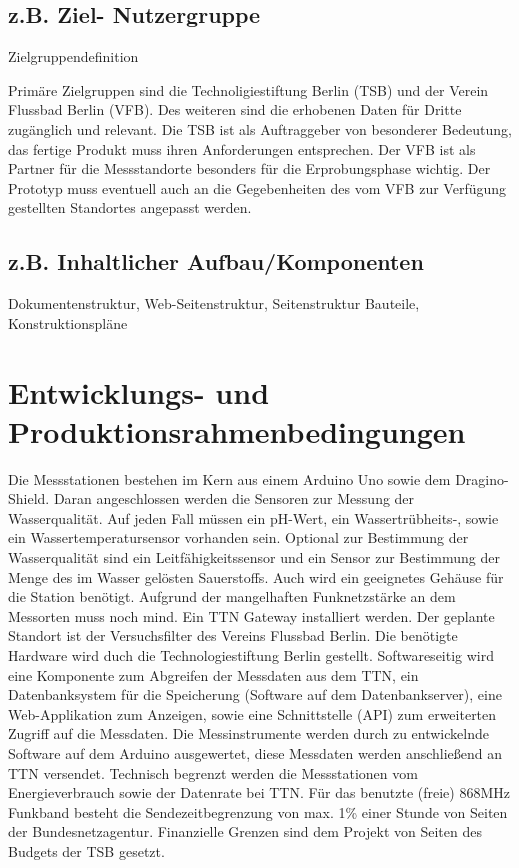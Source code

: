 \documentclass[
11pt,
a4paper,
ngerman,
]{article}
\newcommand{\descriptionWhat}[1]{%
	\begin{itshape}%
	#1 \\%
	\end{itshape}%
}
\begin{document}
\subsection{z.B. Ziel- Nutzergruppe}

\descriptionWhat{Zielgruppendefinition}

Primäre Zielgruppen sind die Technoligiestiftung Berlin (TSB) und der Verein Flussbad Berlin (VFB). Des weiteren  sind die erhobenen Daten für Dritte zugänglich und relevant. Die TSB ist als Auftraggeber von besonderer Bedeutung, das fertige Produkt muss ihren Anforderungen entsprechen. Der VFB ist als Partner für die Messstandorte besonders für die Erprobungsphase wichtig. Der Prototyp muss eventuell auch an die Gegebenheiten des vom VFB zur Verfügung gestellten Standortes angepasst werden.

\subsection{z.B. Inhaltlicher Aufbau/Komponenten}

\descriptionWhat{Dokumentenstruktur, Web-Seitenstruktur, Seitenstruktur Bauteile, Konstruktionspläne}

\newpage

\section{Entwicklungs- und Produktionsrahmenbedingungen}

Die Messstationen bestehen im Kern aus einem Arduino Uno sowie dem Dragino-Shield. Daran angeschlossen werden die Sensoren zur Messung der Wasserqualität. Auf jeden Fall müssen ein pH-Wert, ein Wassertrübheits-, sowie ein Wassertemperatursensor vorhanden sein. Optional zur Bestimmung der Wasserqualität sind ein Leitfähigkeitssensor und ein Sensor zur Bestimmung der Menge des im Wasser gelösten Sauerstoffs. Auch wird ein geeignetes Gehäuse für die Station benötigt.
Aufgrund der mangelhaften Funknetzstärke an dem Messorten muss noch mind. Ein TTN Gateway installiert werden. Der geplante Standort ist der Versuchsfilter des Vereins Flussbad Berlin. Die benötigte Hardware wird duch die Technologiestiftung Berlin gestellt.
Softwareseitig wird eine Komponente zum Abgreifen der Messdaten aus dem TTN, ein Datenbanksystem für die Speicherung (Software auf dem Datenbankserver), eine Web-Applikation zum Anzeigen, sowie eine Schnittstelle (API) zum erweiterten Zugriff auf die Messdaten. Die Messinstrumente werden durch zu entwickelnde Software auf dem Arduino ausgewertet, diese Messdaten werden anschließend an TTN versendet.
Technisch begrenzt werden die Messstationen vom Energieverbrauch sowie der Datenrate bei TTN. Für das benutzte (freie) 868MHz Funkband besteht die Sendezeitbegrenzung von max. 1\% einer Stunde von Seiten der Bundesnetzagentur.
Finanzielle Grenzen sind dem Projekt von Seiten des Budgets der TSB gesetzt.
\end{document}
